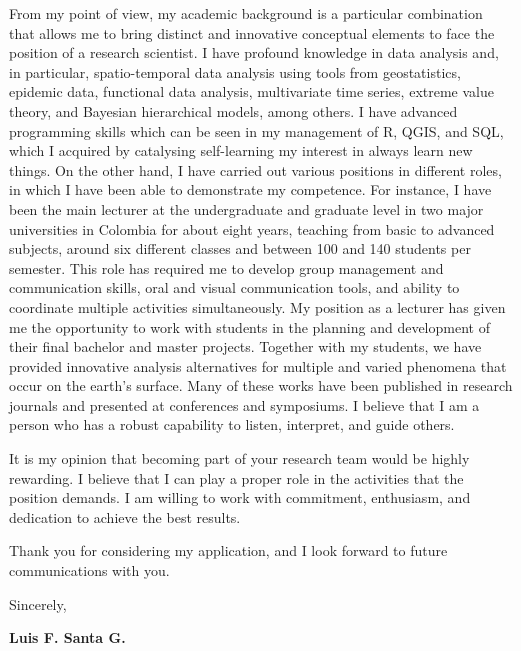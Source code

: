 \documentclass[11pt, a4paper]{awesome-cv}
\begin{document}
\begin{cvletter}
From my point of view, my academic background is a particular combination that allows me to bring distinct and innovative conceptual elements to face the position of a research scientist. I have profound knowledge in data analysis and, in particular, spatio-temporal data analysis using tools from geostatistics, epidemic data, functional data analysis, multivariate time series, extreme value theory, and  Bayesian hierarchical models, among others. I have advanced programming skills which can be seen in my management of R, QGIS, and SQL, which I acquired by catalysing self-learning my interest in always learn new things. On the other hand, I have carried out various positions in different roles, in which I have been able to demonstrate my competence. For instance, I have been the main lecturer at the undergraduate and graduate level in two major universities in Colombia for about eight years, teaching from basic to advanced subjects, around six different classes and between 100 and 140 students per semester. This role has required me to develop group management and communication skills, oral and visual communication tools, and ability to coordinate multiple activities simultaneously. My position as a lecturer has given me the opportunity to work with students in the planning and development of their final bachelor and master projects. Together with my students, we have provided innovative analysis alternatives for multiple and varied phenomena that occur on the earth's surface. Many of these works have been published in research journals and presented at conferences and symposiums. I believe that I am a person who has a robust capability to listen, interpret, and guide others. \par
It is my opinion that becoming part of your research team would be highly rewarding. I believe that I can play a proper role in the activities that the position demands. I am willing to work with commitment, enthusiasm, and dedication to achieve the best results.\par
Thank you for considering my application, and I look forward to future communications with you.\par
Sincerely,\par
{\bf Luis F. Santa G.}
\end{cvletter}


\end{document}
